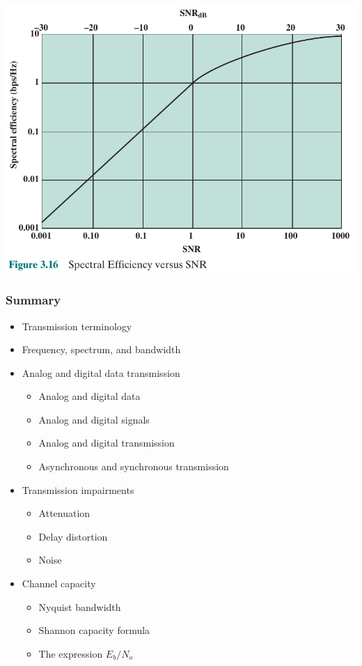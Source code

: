 \documentclass[pdflatex,compress]{beamer}
\begin{document}
\begin{frame}
	\begin{center}
		\includegraphics[width=0.9\linewidth]{img/img17}
	\end{center}
\end{frame}

\begin{frame}
	\frametitle{Summary}
	\begin{itemize}
		\item Transmission terminology
		\item Frequency, spectrum, and bandwidth
		\item Analog and digital data transmission
		\begin{itemize}
			\item Analog and digital data
			\item Analog and digital signals
			\item Analog and digital transmission
			\item Asynchronous and synchronous transmission
		\end{itemize}
		\item Transmission impairments
		\begin{itemize}
			\item  Attenuation
			\item Delay distortion
			\item Noise
		\end{itemize}
		\item Channel capacity
		\begin{itemize}
			\item Nyquist bandwidth
			\item Shannon capacity formula
			\item The expression $ E_b /N_o $
		\end{itemize}
	\end{itemize}
\end{frame}
\end{document}
